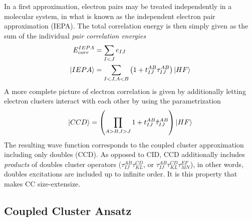 In a first approximation, electron pairs may be treated independently in a molecular system, in what is known as the independent electron pair approximation (IEPA). The total correlation energy is then simply given as the sum of the individual \emph{pair correlation energies}
\begin{align}
E_{corr}^{IEPA} &= \sum_{I < J} e_{IJ}  \\
\ket{IEPA} &= \sum_{I < J, A < B} \left(1 + t_{IJ}^{AB}\mathbf{\tau}_{IJ}^{AB} \right) \ket{HF} 
\end{align}
\noindent A more complete picture of electron correlation is given by additionally letting electron clusters interact with each other by using the parametrization
\begin{equation}
\ket{CCD} = \left( \prod_{A > B,I > J} 1 + t_{IJ}^{AB}\hat{\tau}_{IJ}^{AB} \right) \ket{HF}
\end{equation}
\noindent The resulting wave function corresponds to the coupled cluster approximation including only doubles (CCD). As opposed to CID, CCD additionally includes \emph{products} of doubles cluster operators ($\tau_{IJ}^{AB} \tau_{KL}^{CD}$, or $\tau_{IJ}^{AB} \tau_{KL}^{CD} \tau_{MN}^{EF}$), in other words, doubles excitations are included up to infinite order. It is this property that makes CC size-extensize.


\subsection{Coupled Cluster Ansatz}

